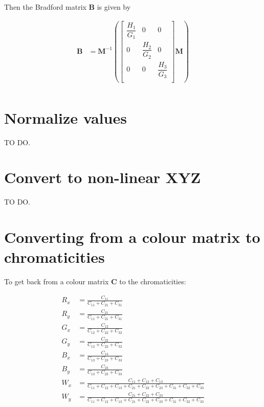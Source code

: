 \documentclass{article}
\begin{document}
Then the Bradford matrix $\mathbf{B}$ is given by

\begin{align}
\mathbf{B} &= \mathbf{M}^{-1}
\left(\left[\begin{matrix} \dfrac{H_1}{G_1} & 0 & 0 \\ 0 & \dfrac{H_2}{G_2} & 0 \\ 0 & 0 & \dfrac{H_3}{G_3} \\ \end{matrix}\right] \mathbf{M}\right) \\
\end{align}


\section{Normalize values}

TO DO.

\section{Convert to non-linear XYZ}

TO DO.


\section{Converting from a colour matrix to chromaticities}

To get back from a colour matrix $\mathbf{C}$ to the chromaticities:

\begin{align}
R_x &= \frac{C_{11}}{C_{11} + C_{21} + C_{31}} \\
R_y &= \frac{C_{21}}{C_{11} + C_{21} + C_{31}} \\
G_x &= \frac{C_{12}}{C_{12} + C_{22} + C_{32}} \\
G_y &= \frac{C_{22}}{C_{12} + C_{22} + C_{32}} \\
B_x &= \frac{C_{13}}{C_{13} + C_{23} + C_{33}} \\
B_y &= \frac{C_{23}}{C_{13} + C_{23} + C_{33}} \\
W_x &= \frac{C_{11} + C_{12} + C_{13}}{C_{11} + C_{12} + C_{13} + C_{21} + C_{22} + C_{23} + C_{31} + C_{32} + C_{33}} \\
W_y &= \frac{C_{21} + C_{22} + C_{23}}{C_{11} + C_{12} + C_{13} + C_{21} + C_{22} + C_{23} + C_{31} + C_{32} + C_{33}}
\end{align}
\end{document}
